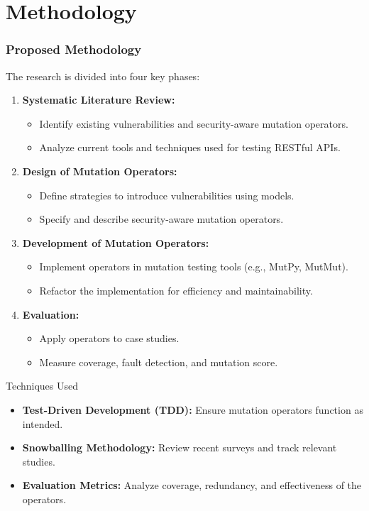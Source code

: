 \documentclass[12pt]{beamer}
\theoremstyle{remark}
\theoremstyle{definition}
\begin{document}
\section{Methodology}
\begin{frame}[allowframebreaks]
\frametitle{Proposed Methodology}
The research is divided into four key phases:
\begin{enumerate}
    \item \textbf{Systematic Literature Review:} 
    \begin{itemize}
        \item Identify existing vulnerabilities and security-aware mutation operators.
        \item Analyze current tools and techniques used for testing RESTful APIs.
    \end{itemize}
    \item \textbf{Design of Mutation Operators:} 
    \begin{itemize}
        \item Define strategies to introduce vulnerabilities using models.
        \item Specify and describe security-aware mutation operators.
    \end{itemize}
    \item \textbf{Development of Mutation Operators:} 
    \begin{itemize}
        \item Implement operators in mutation testing tools (e.g., MutPy, MutMut).
        \item Refactor the implementation for efficiency and maintainability.
    \end{itemize}
    \item \textbf{Evaluation:} 
    \begin{itemize}
        \item Apply operators to case studies.
        \item Measure coverage, fault detection, and mutation score.
    \end{itemize}
\end{enumerate}

\begin{block}{Techniques Used}
\begin{itemize}
    \item \textbf{Test-Driven Development (TDD):} Ensure mutation operators function as intended.
    \item \textbf{Snowballing Methodology:} Review recent surveys and track relevant studies.
    \item \textbf{Evaluation Metrics:} Analyze coverage, redundancy, and effectiveness of the operators.
\end{itemize}
\end{block}


\end{frame}
\end{document}
